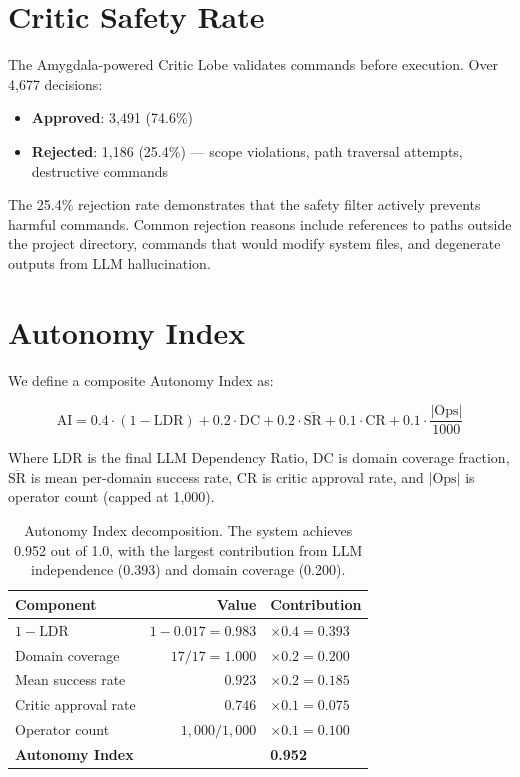 \documentclass[12pt,a4paper]{report}
\begin{document}
\section{Critic Safety Rate}

The Amygdala-powered Critic Lobe validates commands before execution. Over 4{,}677 decisions:

\begin{itemize}
    \item \textbf{Approved}: 3{,}491 (74.6\%)
    \item \textbf{Rejected}: 1{,}186 (25.4\%) --- scope violations, path traversal attempts, destructive commands
\end{itemize}

The 25.4\% rejection rate demonstrates that the safety filter actively prevents harmful commands. Common rejection reasons include references to paths outside the project directory, commands that would modify system files, and degenerate outputs from LLM hallucination.

\section{Autonomy Index}

We define a composite Autonomy Index as:

\begin{equation}
\text{AI} = 0.4 \cdot (1 - \text{LDR}) + 0.2 \cdot \text{DC} + 0.2 \cdot \overline{\text{SR}} + 0.1 \cdot \text{CR} + 0.1 \cdot \frac{|\text{Ops}|}{1000}
\end{equation}

Where LDR is the final LLM Dependency Ratio, DC is domain coverage fraction, $\overline{\text{SR}}$ is mean per-domain success rate, CR is critic approval rate, and $|\text{Ops}|$ is operator count (capped at 1{,}000).

\begin{table}[H]
\centering
\begin{tabular}{lrl}
\toprule
\textbf{Component} & \textbf{Value} & \textbf{Contribution} \\
\midrule
$1 - \text{LDR}$ & $1 - 0.017 = 0.983$ & $\times 0.4 = 0.393$ \\
Domain coverage & $17/17 = 1.000$ & $\times 0.2 = 0.200$ \\
Mean success rate & $0.923$ & $\times 0.2 = 0.185$ \\
Critic approval rate & $0.746$ & $\times 0.1 = 0.075$ \\
Operator count & $1{,}000/1{,}000$ & $\times 0.1 = 0.100$ \\
\midrule
\textbf{Autonomy Index} & & \textbf{0.952} \\
\bottomrule
\end{tabular}
\caption{Autonomy Index decomposition. The system achieves 0.952 out of 1.0, with the largest contribution from LLM independence (0.393) and domain coverage (0.200).}
\label{tab:autonomy-index}
\end{table}
\end{document}
